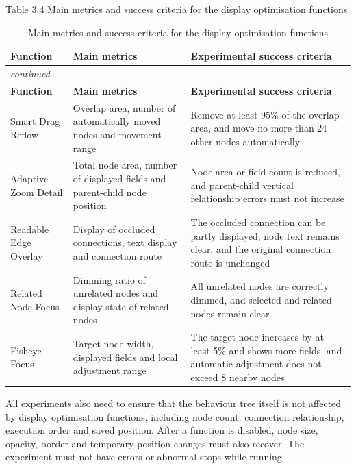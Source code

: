 Table 3.4 Main metrics and success criteria for the display optimisation functions

\begin{center}

\begin{longtable}{@{}p{} p{} p{}@{}}
\caption{Main metrics and success criteria for the display optimisation functions}\label{tab:display-metrics-criteria}\\
\toprule
\textbf{Function} & \textbf{Main metrics} & \textbf{Experimental success criteria} \\
\midrule
\endfirsthead
\multicolumn{3}{l}{\itshape continued}\\
\toprule
\textbf{Function} & \textbf{Main metrics} & \textbf{Experimental success criteria} \\
\midrule
\endhead
Smart Drag Reflow & Overlap area, number of automatically moved nodes and movement range & Remove at least 95\% of the overlap area, and move no more than 24 other nodes automatically \\
Adaptive Zoom Detail & Total node area, number of displayed fields and parent-child node position & Node area or field count is reduced, and parent-child vertical relationship errors must not increase \\
Readable Edge Overlay & Display of occluded connections, text display and connection route & The occluded connection can be partly displayed, node text remains clear, and the original connection route is unchanged \\
Related Node Focus & Dimming ratio of unrelated nodes and display state of related nodes & All unrelated nodes are correctly dimmed, and selected and related nodes remain clear \\
Fisheye Focus & Target node width, displayed fields and local adjustment range & The target node increases by at least 5\% and shows more fields, and automatic adjustment does not exceed 8 nearby nodes \\
\bottomrule
\end{longtable}
\end{center}

All experiments also need to ensure that the behaviour tree itself is not affected by display optimisation functions, including node count, connection relationship, execution order and saved position. After a function is disabled, node size, opacity, border and temporary position changes must also recover. The experiment must not have errors or abnormal stops while running.


